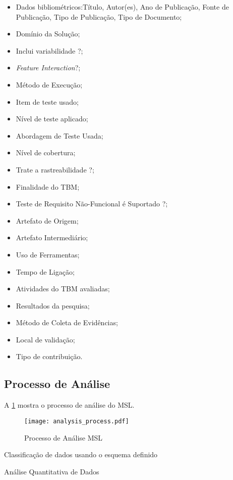 \begin{itemize}
	\item Dados bibliométricos:Título, Autor(es), Ano de Publicação, Fonte de Publicação, Tipo de Publicação, Tipo de Documento;
	\item Domínio da Solução;
	\item Inclui variabilidade ?;
	\item \textit{Feature Interaction}?;
	\item Método de Execução;
	\item Item de teste usado;
	\item Nível de teste aplicado;
	\item Abordagem de Teste Usada;
	\item Nível de cobertura;
	\item Trate a rastreabilidade ?;
	\item Finalidade do TBM;
	\item Teste de Requisito Não-Funcional é Suportado ?;
	\item Artefato de Origem;
	\item Artefato Intermediário;
	\item Uso de Ferramentas;
	\item Tempo de Ligação;
	\item Atividades do TBM avaliadas;
	\item Resultados da pesquisa;
	\item Método de Coleta de Evidências;
	\item Local de validação;
	\item Tipo de contribuição.
	
\end{itemize}

\subsection{Processo de Análise}
\label{sec:analysis_process}

A \ref{fig:analysis_process} mostra o processo de análise do MSL.

\begin{figure} [!h]
	\centering
	\texttt{[image: analysis\_process.pdf]}
	\caption{Processo de Análise MSL}
	\label{fig:analysis_process}
\end{figure}

Classificação de dados usando o esquema definido

Análise Quantitativa de Dados

